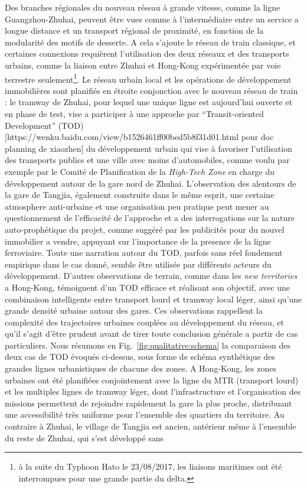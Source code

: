 {Des branches régionales du nouveau réseau à grande vitesse, comme la ligne Guangzhou-Zhuhai, peuvent être vues comme à l'intermédiaire entre un service a longue distance et un transport régional de proximité, en fonction de la modularité des motifs de desserte. A cela s'ajoute le réseau de train classique, et certaines connexions requièrent l'utilisation des deux réseaux et des transports urbains, comme la liaison entre Zhuhai et Hong-Kong expérimentée par voie terrestre seulement\footnote{à la suite du Typhoon Hato le 23/08/2017, les liaisons maritimes ont été interrompues pour une grande partie du delta.}. Le réseau urbain local et les opérations de développement immobilières sont planifiés en étroite conjonction avec le nouveau réseau de train : le tramway de Zhuhai, pour lequel une unique ligne est aujourd'hui ouverte et en phase de test, vise a participer à une approche par ``Transit-oriented Development'' (TOD)[https://wenku.baidu.com/view/b1526461ff00bed5b8f31d01.html pour doc planning de xiaozhen] du développement urbain qui vise à favoriser l'utilisation des transports publics et une ville avec moins d'automobiles, comme voulu par exemple par le Comité de Planification de la \emph{High-Tech Zone} en charge du développement autour de la gare nord de Zhuhai. L'observation des alentours de la gare de Tangjia, également construite dans le même esprit, une certaine atmosphere anti-urbaine et une organisation peu pratique peut mener au questionnement de l'efficacité de l'approche et a des interrogations sur la nature auto-prophétique du projet, comme suggéré par les publicités pour du nouvel immobilier a vendre,  appuyant sur l'importance de la presence de la ligne ferroviaire. Toute une narration autour du TOD, parfois sans réel fondement empirique dans le cas donné, semble être utilisée par différents acteurs du développement. D'autres observations de terrain, comme dans les \emph{new territories} a Hong-Kong, témoignent d'un TOD efficace et réalisant son objectif, avec une combinaison intelligente entre transport lourd et tramway local léger, ainsi qu'une grande densité urbaine autour des gares. Ces observations rappellent la complexité des trajectoires urbaines couplées au développement du réseau, et qu'il s'agit d'être prudent avant de tirer toute conclusion générale a partir de cas particuliers. Nous résumons en Fig.~\ref{fig:qualitative:schema} la comparaison des deux cas de TOD évoqués ci-dessus, sous forme de schéma synthétique des grandes lignes urbanistiques de chacune des zones. A Hong-Kong, les zones urbaines ont été planifiées conjointement avec la ligne du MTR (transport lourd) et les multiples lignes de tramway léger, dont l'infrastructure et l'organisation des missions permettent de rejoindre rapidement la gare la plus proche, distribuant une accessibilité très uniforme pour l'ensemble des quartiers du territoire. Au contraire à Zhuhai, le village de Tangjia est ancien, antérieur même à l'ensemble du reste de Zhuhai, qui s'est développé sans }
